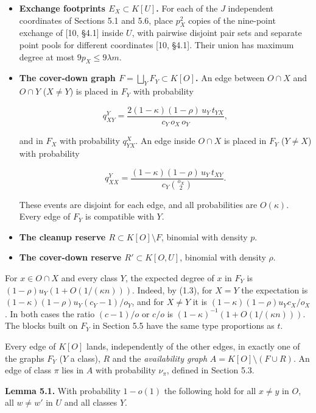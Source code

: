 \documentclass[english,11pt,a4paper]{article}
\begin{document}
\begin{itemize}
\item
  \textbf{Exchange footprints \(E_X\subset K[U]\).} For each of the \(J\) independent coordinates of Sections 5.1 and 5.6, place \(p_X^2\) copies of the nine-point exchange of {[}10, §4.1{]} inside \(U\), with pairwise disjoint pair sets and separate point pools for different coordinates {[}10, §4.1{]}. Their union has maximum degree at most \(9p_X\le9\lambda m\).
\item
  \textbf{The cover-down graph \(F=\bigsqcup_YF_Y\subset K[O]\).} An edge between \(O\cap X\) and \(O\cap Y\) (\(X\ne Y\)) is placed in \(F_Y\) with probability

  \[q^Y_{XY}=\frac{2(1-\kappa)(1-\rho)\,u_Y\,t_{YX}}{c_Y\,o_X\,o_Y},\]

  and in \(F_X\) with probability \(q^X_{YX}\). An edge inside \(O\cap X\) is placed in \(F_Y\) (\(Y\ne X\)) with probability

  \[q^Y_{XX}=\frac{(1-\kappa)(1-\rho)\,u_Y\,t_{XY}}{c_Y\binom{o_X}{2}}.\]

  These events are disjoint for each edge, and all probabilities are \(O(\kappa)\). Every edge of \(F_Y\) is compatible with \(Y\).
\item
  \textbf{The cleanup reserve \(R\subset K[O]\setminus F\)}, binomial with density \(p\).
\item
  \textbf{The cover-down reserve \(R'\subset K[O,U]\)}, binomial with density \(\rho\).
\end{itemize}

For \(x\in O\cap X\) and every class \(Y\), the expected degree of \(x\) in \(F_Y\) is \((1-\rho)u_Y(1+O(1/(\kappa n)))\). Indeed, by (1.3), for \(X=Y\) the expectation is \((1-\kappa)(1-\rho)u_Y(c_Y-1)/o_Y\), and for \(X\ne Y\) it is \((1-\kappa)(1-\rho)u_Yc_X/o_X\). In both cases the ratio \((c-1)/o\) or \(c/o\) is \((1-\kappa)^{-1}(1+O(1/(\kappa n)))\). The blocks built on \(F_Y\) in Section 5.5 have the same type proportions as \(t\).

Every edge of \(K[O]\) lands, independently of the other edges, in exactly one of the graphs \(F_Y\) (\(Y\) a class), \(R\) and the \emph{availability graph} \(A=K[O]\setminus(F\cup R)\). An edge of class \(\pi\) lies in \(A\) with probability \(\nu_\pi\), defined in Section 5.3.

\textbf{Lemma 5.1.} With probability \(1-o(1)\) the following hold for all \(x\ne y\) in \(O\), all \(w\ne w'\) in \(U\) and all classes \(Y\).
\end{document}
